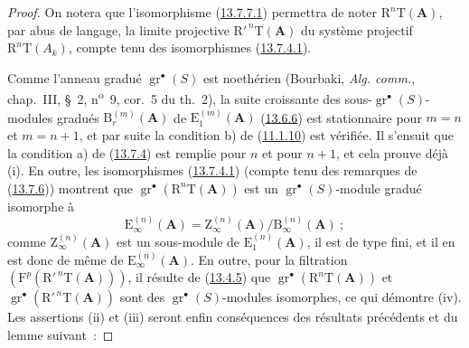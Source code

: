 \begin{proof}
On notera que l'isomorphisme (\hyperref[0.13.7.7.1-fr]{13.7.7.1})
permettra de noter $\mathrm R^n\mathrm T(\mathbf A)$, par abus de langage, la
limite projective $\mathrm R'^{\,n}\mathrm T(\mathbf A)$ du système projectif
$\mathrm R^n\mathrm T(A_k)$, compte tenu des isomorphismes
(\hyperref[0.13.7.4.1-fr]{13.7.4.1}).

Comme l'anneau gradué $\operatorname{gr}^\bullet(S)$ est noethérien
(Bourbaki, \emph{Alg. comm.}, chap.~III, \S~2, n\textsuperscript{o}~9,
cor.~5 du th.~2), la suite croissante des sous-$\operatorname{gr}^\bullet(S)$-
modules gradués $\mathrm B_r^{(m)}(\mathbf A)$ de
$\mathrm E_1^{(m)}(\mathbf A)$ (\hyperref[0.13.6.6-fr]{13.6.6}) est
stationnaire pour $m=n$ et $m=n+1$, et par suite la condition b) de
(\hyperref[0.11.1.10-fr]{11.1.10}) est vérifiée. Il s'ensuit que la condition
a) de (\hyperref[0.13.7.4-fr]{13.7.4}) est remplie pour $n$ et pour $n+1$,
et cela prouve déjà (i). En outre, les isomorphismes
(\hyperref[0.13.7.4.1-fr]{13.7.4.1}) (compte tenu des remarques de
(\hyperref[0.13.7.6-fr]{13.7.6})) montrent que
$\operatorname{gr}^\bullet(\mathrm R^n\mathrm T(\mathbf A))$ est un
$\operatorname{gr}^\bullet(S)$-module gradué isomorphe à
\[
\mathrm E_\infty^{(n)}(\mathbf A)=
\mathrm Z_\infty^{(n)}(\mathbf A)/\mathrm B_\infty^{(n)}(\mathbf A)~;
\]
comme $\mathrm Z_\infty^{(n)}(\mathbf A)$ est un sous-module de
$\mathrm E_1^{(n)}(\mathbf A)$, il est de type fini, et il en est donc de
même de $\mathrm E_\infty^{(n)}(\mathbf A)$. En outre, pour la filtration
$(\mathrm F^p(\mathrm R'^{\,n}\mathrm T(\mathbf A)))$, il résulte de
(\hyperref[0.13.4.5-fr]{13.4.5}) que
$\operatorname{gr}^\bullet(\mathrm R^n\mathrm T(\mathbf A))$ et
$\operatorname{gr}^\bullet(\mathrm R'^{\,n}\mathrm T(\mathbf A))$ sont des
$\operatorname{gr}^\bullet(S)$-modules isomorphes, ce qui démontre (iv). Les
assertions (ii) et (iii) seront enfin conséquences des résultats précédents
et du lemme suivant~:
\end{proof}

